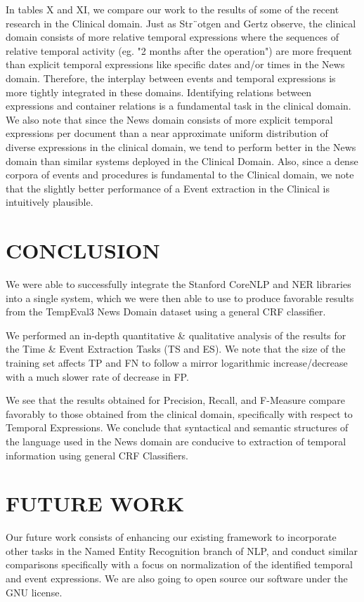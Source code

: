 \documentclass[letterpaper, 10 pt, conference]{ieeeconf}
\begin{document}
In tables X and XI, we compare our work to the results of some of the recent research in the Clinical domain. Just as Str¨otgen and Gertz observe\cite{c7}, the clinical domain consists of more relative temporal expressions where the sequences of relative temporal activity (eg. "2 months after the operation") are more frequent than explicit temporal expressions like specific dates and/or times in the News domain. Therefore, the interplay between events and temporal expressions is more tightly integrated in these domains. Identifying relations between expressions and container relations is a fundamental task in the clinical domain. We also note that since the News domain consists of more explicit temporal expressions per document than a near approximate uniform distribution of diverse expressions in the clinical domain, we tend to perform better in the News domain than similar systems deployed in the Clinical Domain. Also, since a dense corpora of events and procedures is fundamental to the Clinical domain, we note that the slightly better performance of a Event extraction in the Clinical is intuitively plausible. 

\section{CONCLUSION}
We were able to successfully integrate the Stanford CoreNLP and NER libraries into a single system, which we were then able to use to produce favorable results from the TempEval3 News Domain dataset using a general CRF classifier.

We performed an in-depth quantitative \& qualitative analysis of the results for the Time \& Event Extraction Tasks (TS and ES). We note that the size of the training set affects TP and FN to follow a mirror logarithmic increase/decrease with a much slower rate of decrease in FP.

We see that the results obtained for Precision, Recall, and F-Measure compare favorably to those obtained from the clinical domain, specifically with respect to Temporal Expressions. We conclude that syntactical and semantic structures of the language used in the News domain are conducive to extraction of temporal information using general CRF Classifiers. 

\section{FUTURE WORK}

Our future work consists of enhancing our existing framework to incorporate other tasks in the Named Entity Recognition branch of NLP, and conduct similar comparisons specifically with a focus on normalization of the identified temporal and event expressions. We are also going to open source our software under the GNU license.
\end{document}

